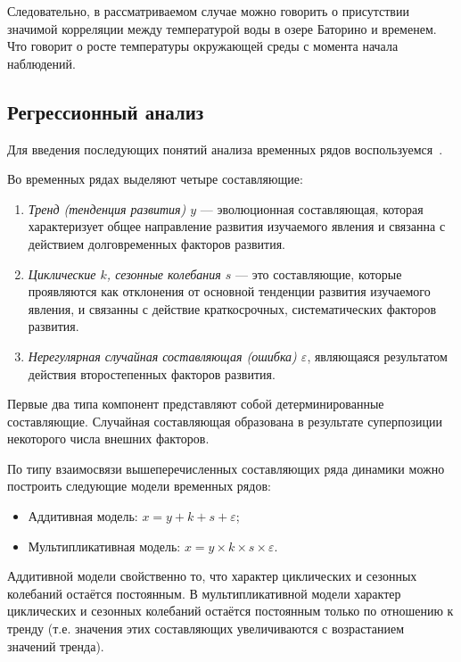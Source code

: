 Следовательно, в рассматриваемом случае можно говорить о присутствии значимой корреляции между температурой воды в озере Баторино и временем. Что говорит о росте температуры окружающей среды с момента начала наблюдений.


\subsection{Регрессионный анализ} %
\label{sec:regr_analysis}

Для введения последующих понятий анализа временных рядов воспользуемся~\cite{Eddows1997}.

Во временных рядах выделяют четыре составляющие:
\begin{enumerate}
	\item \textit{Тренд (тенденция развития) $ y $} --- эволюционная составляющая, которая характеризует общее направление развития изучаемого явления и связанна с действием долговременных факторов развития.
	\item \textit{Циклические $ k $, сезонные колебания $ s $} --- это составляющие, которые проявляются как отклонения от основной тенденции развития изучаемого явления, и связанны с действие краткосрочных, систематических факторов развития.
	\item \textit{Нерегулярная случайная составляющая (ошибка) $ \varepsilon $}, являющаяся результатом действия второстепенных факторов развития.
\end{enumerate}
Первые два типа компонент представляют собой детерминированные составляющие. Случайная составляющая образована в результате суперпозиции некоторого числа внешних факторов.

По типу взаимосвязи вышеперечисленных составляющих ряда динамики можно построить следующие модели временных рядов:
\begin{itemize}
	\item Аддитивная модель: $ x = y + k + s + \varepsilon $;
	\item Мультипликативная модель: $x = y \times k \times s \times \varepsilon$.
\end{itemize}

Аддитивной модели свойственно то, что характер циклических и сезонных колебаний остаётся постоянным. В мультипликативной модели характер циклических и сезонных колебаний остаётся постоянным только по отношению к тренду (т.е. значения этих составляющих увеличиваются с возрастанием значений тренда).

